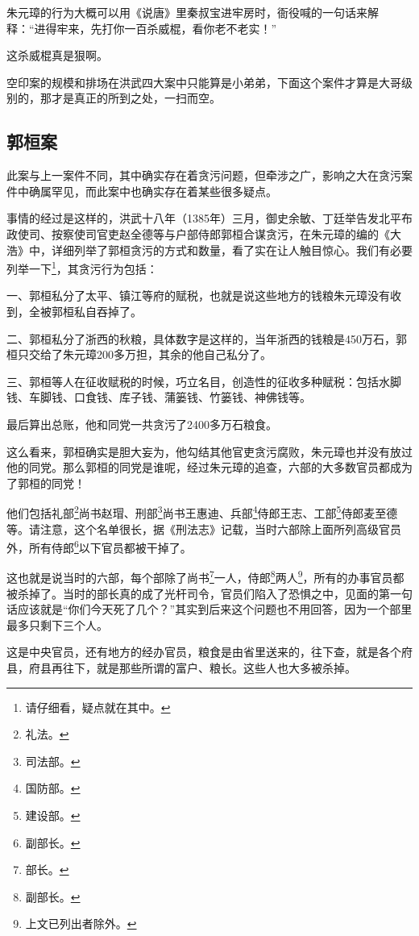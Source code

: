 \begin{multicols}{\theparacolNo}
		朱元璋的行为大概可以用《说唐》里秦叔宝进牢房时，衙役喊的一句话来解释：“进得牢来，先打你一百杀威棍，看你老不老实！”

		这杀威棍真是狠啊。

		空印案的规模和排场在洪武四大案中只能算是小弟弟，下面这个案件才算是大哥级别的，那才是真正的所到之处，一扫而空。

		\subsection{郭桓案}
		此案与上一案件不同，其中确实存在着贪污问题，但牵涉之广，影响之大在贪污案件中确属罕见，而此案中也确实存在着某些很多疑点。

		事情的经过是这样的，洪武十八年（1385年）三月，御史余敏、丁廷举告发北平布政使司、按察使司官吏赵全德等与户部侍郎郭桓合谋贪污，在朱元璋的编的《大浩》中，详细列举了郭桓贪污的方式和数量，看了实在让人触目惊心。我们有必要列举一下\footnote{请仔细看，疑点就在其中。}，其贪污行为包括：

		一、郭桓私分了太平、镇江等府的赋税，也就是说这些地方的钱粮朱元璋没有收到，全被郭桓私自吞掉了。

		二、郭桓私分了浙西的秋粮，具体数字是这样的，当年浙西的钱粮是450万石，郭桓只交给了朱元璋200多万担，其余的他自己私分了。

		三、郭桓等人在征收赋税的时候，巧立名目，创造性的征收多种赋税：包括水脚钱、车脚钱、口食钱、库子钱、蒲篓钱、竹篓钱、神佛钱等。

		最后算出总账，他和同党一共贪污了2400多万石粮食。

		这么看来，郭桓确实是胆大妄为，他勾结其他官吏贪污腐败，朱元璋也并没有放过他的同党。那么郭桓的同党是谁呢，经过朱元璋的追查，六部的大多数官员都成为了郭桓的同党！

		他们包括礼部\footnote{礼法。}尚书赵瑁、刑部\footnote{司法部。}尚书王惠迪、兵部\footnote{国防部。}侍郎王志、工部\footnote{建设部。}侍郎麦至德等。请注意，这个名单很长，据《刑法志》记载，当时六部除上面所列高级官员外，所有侍郎\footnote{副部长。}以下官员都被干掉了。

		这也就是说当时的六部，每个部除了尚书\footnote{部长。}一人，侍郎\footnote{副部长。}两人\footnote{上文已列出者除外。}，所有的办事官员都被杀掉了。当时的部长真的成了光杆司令，官员们陷入了恐惧之中，见面的第一句话应该就是“你们今天死了几个？”其实到后来这个问题也不用回答，因为一个部里最多只剩下三个人。

		这是中央官员，还有地方的经办官员，粮食是由省里送来的，往下查，就是各个府县，府县再往下，就是那些所谓的富户、粮长。这些人也大多被杀掉。


\end{multicols}
